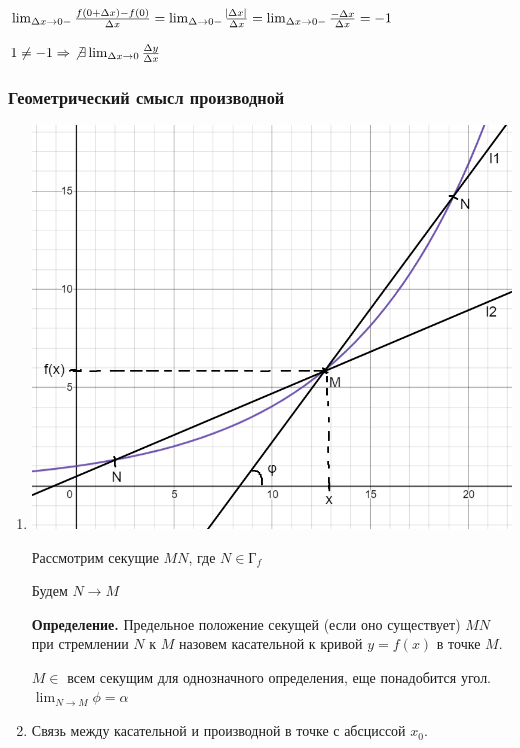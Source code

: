 \documentclass{article}
\begin{document}
    \( \lim_{\Delta x \to 0-} \frac{f(0 + \Delta x) - f(0)}{\Delta x} = \lim_{\Delta \to 0-} \frac{\abs{\Delta x}}{\Delta x} = \lim_{\Delta x \to 0-} \frac{-\Delta x}{\Delta x} = -1 \)

    \( 1 \neq -1 \Rightarrow\ \not\exists \lim_{\Delta x \to 0} \frac{\Delta y}{\Delta x} \)

    \subsubsection{Геометрический смысл производной}

    \begin{enumerate}
        \item 
        
            \includegraphics[scale=0.35]{11_1_8_1.png}

            Рассмотрим секущие \( MN \), где \( N \in \textrm{Г}_{f} \)

            Будем \( N \to M \)

            \textbf{Определение.} Предельное положение секущей (если оно существует) \( MN \) при стремлении \( N \) к \( M \) назовем касательной к кривой \( y = f(x) \) в точке \( M \).
            
            \( M \in \) всем секущим для однозначного определения, еще понадобится угол. \( \lim_{N \to M} \phi = \alpha \)

        \item Связь между касательной и производной в точке с абсциссой \( x_0 \). 
        

\end{enumerate}
\end{document}
